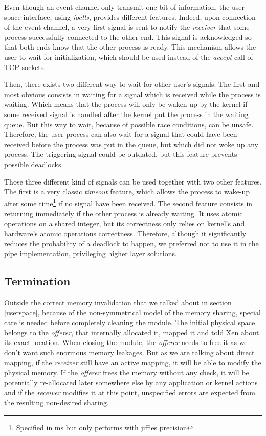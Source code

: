 \documentclass[journal]{IEEEtran}
\begin{document}
Even though an event channel only transmit one bit of information, the user space interface, using \emph{ioctls}, provides different features. Indeed, upon connection of the event channel, a very first signal is sent to notify the \emph{receiver} that some process successfully connected to the other end. This signal is acknowledged so that both ends know that the other process is ready. This mechanism allows the user to wait for initialization, which should be used instead of the \emph{accept} call of TCP sockets.

Then, there exists two different way to wait for other user's signals. The first and most obvious consists in waiting for a signal which is received while the process is waiting. Which means that the process will only be waken up by the kernel if some received signal is handled after the kernel put the process in the waiting queue.  But this way to wait, because of possible race conditions, can be unsafe. Therefore, the user process can also wait for a signal that could have been received before the process was put in the queue, but which did not woke up any process. The triggering signal could be outdated, but this feature prevents possible deadlocks. 

Those three different kind of signals can be used together with two other features. The first is a very classic \emph{timeout} feature, which allows the process to wake-up after some time\footnote{Specified in ms but only performs with jiffies precision} if no signal have been received. The second feature consists in returning immediately if the other process is already waiting. It uses atomic operations on a shared integer, but its correctness only relies on kernel's and hardware's atomic operations correctness. Therefore, although it significantly reduces the probability of a deadlock to happen, we preferred not to use it in the pipe implementation, privileging higher layer solutions.

\subsection{Termination}
\label{Termination}

Outside the correct memory invalidation that we talked about in section \ref{userspace}, because of the non-symmetrical model of the memory sharing, special care is needed before completely cleaning the module. The initial physical space belongs to the \emph{offerer}, that internally allocated it, mapped it and told Xen about its exact location. When closing the module, the \emph{offerer} needs to free it as we don't want such enormous memory leakages. But as we are talking about direct mapping, if the \emph{receiver} still have an active mapping, it will be able to modify the physical memory.
If the \emph{offerer} frees the memory without any check, it will be potentially re-allocated later somewhere else by any application or kernel actions and if the \emph{receiver} modifies it at this point, unspecified errors are expected from the resulting non-desired sharing.
\end{document}
